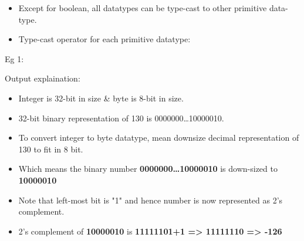\begin{flushleft}
\begin{itemize}
\begin{itemize}
			
			\item Except for boolean, all datatypes can be type-cast to other primitive data-type.
			\item Type-cast operator for each primitive datatype:
			
		\end{itemize}
		
		\newpage
		Eg 1:
	
		Output explaination:
		\begin{itemize}
			\item Integer is 32-bit in size \& byte is 8-bit in size.
			\item 32-bit binary representation of 130 is 0000000…10000010.
			\item To convert integer to byte datatype, mean downsize decimal representation of 130 to fit in 8 bit.
			\item Which means the binary number \textbf{0000000…10000010} is down-sized to \textbf{10000010}
			\item Note that left-most bit is "1" and hence number is now represented as 2's complement.
			\item 2's complement of \textbf{10000010} is \textbf{11111101+1 => 11111110 => -126}
		\end{itemize}


\end{itemize}
\end{flushleft}
